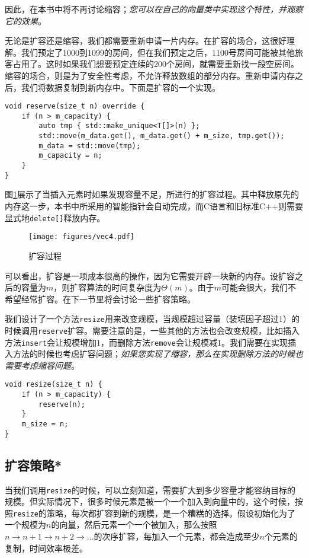 因此，在本书中将不再讨论缩容；\textit{您可以在自己的向量类中实现这个特性，并观察它的效果}。

无论是扩容还是缩容，我们都需要重新申请一片内存。在扩容的场合，这很好理解。我们预定了1000到1099的房间，但在我们预定之后，1100号房间可能被其他旅客占用了。这时如果我们想要预定连续的200个房间，就需要重新找一段空房间。缩容的场合，则是为了安全性考虑，不允许释放数组的部分内存。重新申请内存之后，我们将数据复制到新内存中。下面是扩容的一个实现。

\begin{lstlisting}
void reserve(size_t n) override {
    if (n > m_capacity) {
        auto tmp { std::make_unique<T[]>(n) };
        std::move(m_data.get(), m_data.get() + m_size, tmp.get());
        m_data = std::move(tmp);
        m_capacity = n;
    }
}
\end{lstlisting}

图\ref{fig:vec4}展示了当插入元素时如果发现容量不足，所进行的扩容过程。其中释放原先的内存这一步，本书中所采用的智能指针会自动完成，而C语言和旧标准C++则需要显式地\lstinline{delete[]}释放内存。

\begin{figure}
  \centering
  \texttt{[image: figures/vec4.pdf]}
  \caption{扩容过程}
  \label{fig:vec4}
\end{figure}


可以看出，扩容是一项成本很高的操作，因为它需要开辟一块新的内存。设扩容之后的容量为$m$，则扩容算法的时间复杂度为$\Theta(m)$。由于$m$可能会很大，我们不希望经常扩容。在下一节里将会讨论一些扩容策略。

我们设计了一个方法\lstinline{resize}用来改变规模，当规模超过容量（装填因子超过1）的时候调用\lstinline{reserve}扩容。需要注意的是，一些其他的方法也会改变规模，比如插入方法\lstinline{insert}会让规模增加1，而删除方法\lstinline{remove}会让规模减1。我们需要在实现插入方法的时候也考虑扩容问题；\textit{如果您实现了缩容，那么在实现删除方法的时候也需要考虑缩容问题}。

\begin{lstlisting}
void resize(size_t n) {
    if (n > m_capacity) {
        reserve(n);
    }
    m_size = n;
}
\end{lstlisting}

\subsection{扩容策略*}
当我们调用\lstinline{resize}的时候，可以立刻知道，需要扩大到多少容量才能容纳目标的规模。但实际情况下，很多时候元素是被一个一个加入到向量中的，这个时候，按照\lstinline{resize}的策略，每次都扩容到新的规模，是一个糟糕的选择。假设初始化为了一个规模为$n$的向量，然后元素一个一个被加入，那么按照$n\to n+1 \to n+2 \to \dots$的次序扩容，每加入一个元素，都会造成至少$n$个元素的复制，时间效率极差。

